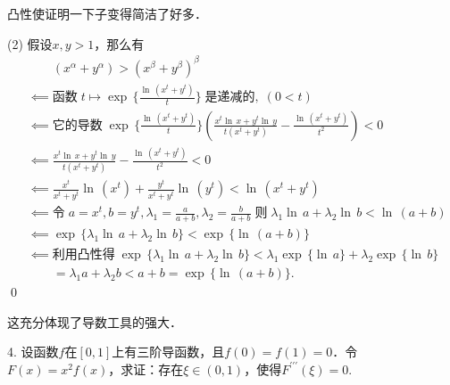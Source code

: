 \annotate 凸性使证明一下子变得简洁了好多．\bigskip

(2) \prove 假设$x,y>1$，那么有
\begin{align}
    &\mathrel{\phantom{\impliedby}} \left(x^\alpha + y^\alpha\right) > \left(x^\beta + y^\beta \right)^\beta \\
    &\impliedby \text{函数} \; t \mapsto \exp \, \{ \frac{\ln \, \left(x^t + y^t \right)}{t}\} \; \text{是递减的}, \; (0 < t) \\
    &\impliedby \text{它的导数} \; \exp \, \{ \frac{\ln \, \left(x^t+y^t\right)}{t} \}\left(\frac{x^t\ln \, x + y^t \ln \, y}{t\left(x^t+y^t\right)} - \frac{\ln \, \left(x^t + y^t\right)}{t^2}\right) < 0 \\
    &\impliedby \frac{x^t\ln \, x + y^t \ln \, y}{t\left(x^t+y^t\right)} - \frac{\ln \, \left(x^t + y^t\right)}{t^2} < 0 \\
    &\impliedby \frac{x^t}{x^t+y^t} \ln \, \left(x^t\right) + \frac{y^t}{x^t+y^t} \ln \, \left(y^t\right) < \ln \, \left(x^t+y^t\right) \\
    &\impliedby \text{令} \; a = x^t, b = y^t, \lambda_1 = \frac{a}{a+b}, \lambda_2 = \frac{b}{a+b} \; \text{则} \; \lambda_1 \ln \, a + \lambda_2 \ln \, b < \ln \, \left(a+b\right) \\
    &\impliedby \exp \, \{\lambda_1 \ln \, a + \lambda_2 \ln \, b\} < \exp \, \{\ln \, \left(a+b\right)\} \\
    &\impliedby \text{利用凸性得} \; \exp \, \{\lambda_1 \ln \, a + \lambda_2 \ln \, b\} < \lambda_1  \exp \, \{ \ln \, a \} + \lambda_2 \exp \, \{ \ln \, b \} \\
    &\mathrel{\phantom{\impliedby}} = \lambda_1 a + \lambda_2 b < a+b = \exp \, \{\ln \, \left(a+b\right)\}.
\end{align}
\qed\bigskip

\annotate 这充分体现了导数工具的强大．\bigskip

4. 设函数$f$在$[0,1]$上有三阶导函数，且$f(0)=f(1)=0$．令$F(x)=x^2 f(x)$，求证：存在$\xi \in (0,1)$，使得$F^{\prime\prime\prime}(\xi)=0$.
